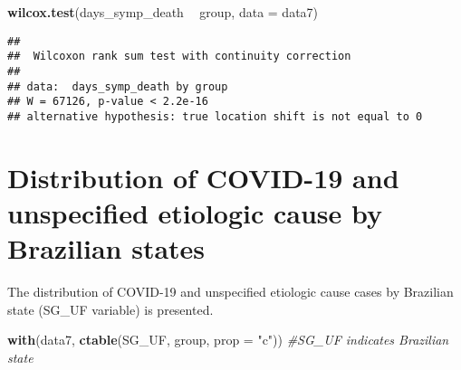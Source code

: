 \documentclass[
]{article}
\newenvironment{Shaded}{\begin{snugshade}}{\end{snugshade}}
\newcommand{\CommentTok}[1]{\textcolor[rgb]{0.56,0.35,0.01}{\textit{#1}}}
\newcommand{\DataTypeTok}[1]{\textcolor[rgb]{0.13,0.29,0.53}{#1}}
\newcommand{\KeywordTok}[1]{\textcolor[rgb]{0.13,0.29,0.53}{\textbf{#1}}}
\newcommand{\NormalTok}[1]{#1}
\newcommand{\OperatorTok}[1]{\textcolor[rgb]{0.81,0.36,0.00}{\textbf{#1}}}
\newcommand{\StringTok}[1]{\textcolor[rgb]{0.31,0.60,0.02}{#1}}
\begin{document}
\begin{Shaded}
\begin{Highlighting}[]
\KeywordTok{wilcox.test}\NormalTok{(days_symp_death }\OperatorTok{~}\StringTok{ }\NormalTok{group, }\DataTypeTok{data =}\NormalTok{ data7)}
\end{Highlighting}
\end{Shaded}

\begin{verbatim}
## 
##  Wilcoxon rank sum test with continuity correction
## 
## data:  days_symp_death by group
## W = 67126, p-value < 2.2e-16
## alternative hypothesis: true location shift is not equal to 0
\end{verbatim}

\hypertarget{distribution-of-covid-19-and-unspecified-etiologic-cause-by-brazilian-states}{%
\section{Distribution of COVID-19 and unspecified etiologic cause by
Brazilian
states}\label{distribution-of-covid-19-and-unspecified-etiologic-cause-by-brazilian-states}}

The distribution of COVID-19 and unspecified etiologic cause cases by
Brazilian state (SG\_UF variable) is presented.

\begin{Shaded}
\begin{Highlighting}[]
\KeywordTok{with}\NormalTok{(data7, }\KeywordTok{ctable}\NormalTok{(SG_UF, group, }\DataTypeTok{prop =} \StringTok{"c"}\NormalTok{)) }\CommentTok{#SG_UF indicates Brazilian state}
\end{Highlighting}
\end{Shaded}
\end{document}
